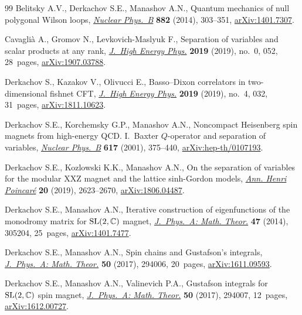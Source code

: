 \documentclass[pdftex]{sigma}
\numberwithin{equation}{section}
\begin{document}
\begin{thebibliography}{99}
Belitsky A.V., Derkachov S.E., Manashov A.N., Quantum mechanics of null
 polygonal {W}ilson loops, \href{https://doi.org/10.1016/j.nuclphysb.2014.03.007}{\textit{Nuclear Phys.~B}} \textbf{882} (2014),
 303--351, \href{https://arxiv.org/abs/1401.7307}{arXiv:1401.7307}.

Cavagli\`a A., Gromov N., Levkovich-Maslyuk F., Separation of variables and
 scalar products at any rank, \href{https://doi.org/10.1007/JHEP09(2019)052}{\textit{J.~High Energy Phys.}} \textbf{2019}
 (2019), no.~0, 052, 28~pages, \href{https://arxiv.org/abs/1907.03788}{arXiv:1907.03788}.

Derkachov S., Kazakov V., Olivucci E., Basso--{D}ixon correlators in
 two-dimensional fishnet {CFT}, \href{https://doi.org/10.1007/JHEP04(2019)032}{\textit{J.~High Energy Phys.}} \textbf{2019}
 (2019), no.~4, 032, 31~pages, \href{https://arxiv.org/abs/1811.10623}{arXiv:1811.10623}.

Derkachov S.E., Korchemsky G.P., Manashov A.N., Noncompact {H}eisenberg spin
 magnets from high-energy {QCD}. {I}.~{B}axter {$Q$}-operator and separation
 of variables, \href{https://doi.org/10.1016/S0550-3213(01)00457-6}{\textit{Nuclear Phys.~B}} \textbf{617} (2001), 375--440,
 \mbox{\href{https://arxiv.org/abs/hep-th/0107193}{arXiv:hep-th/0107193}}.

Derkachov S.E., Kozlowski K.K., Manashov A.N., On the separation of variables
 for the modular {XXZ} magnet and the lattice sinh-{G}ordon models,
 \href{https://doi.org/10.1007/s00023-019-00806-2}{\textit{Ann. Henri Poincar\'e}} \textbf{20} (2019), 2623--2670,
 \href{https://arxiv.org/abs/1806.04487}{arXiv:1806.04487}.

Derkachov S.E., Manashov A.N., Iterative construction of eigenfunctions of the
 monodromy matrix for {${\rm SL}(2,{\mathbb C})$} magnet, \href{https://doi.org/10.1088/1751-8113/47/30/305204}{\textit{J.~Phys.~A:
 Math. Theor.}} \textbf{47} (2014), 305204, 25~pages, \href{https://arxiv.org/abs/1401.7477}{arXiv:1401.7477}.

Derkachov S.E., Manashov A.N., Spin chains and {G}ustafson's integrals,
 \href{https://doi.org/10.1088/1751-8121/aa749a}{\textit{J.~Phys.~A: Math. Theor.}} \textbf{50} (2017), 294006, 20~pages,
 \href{https://arxiv.org/abs/1611.09593}{arXiv:1611.09593}.

Derkachov S.E., Manashov A.N., Valinevich P.A., Gustafson integrals for {${\rm
 SL}(2,{\mathbb C})$} spin magnet, \href{https://doi.org/10.1088/1751-8121/aa7480}{\textit{J.~Phys.~A: Math. Theor.}}
 \textbf{50} (2017), 294007, 12~pages, \href{https://arxiv.org/abs/1612.00727}{arXiv:1612.00727}.


\end{thebibliography}
\end{document}
